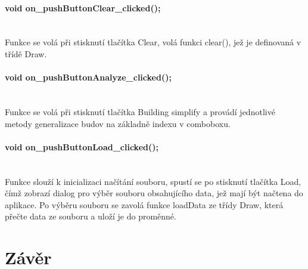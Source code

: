 \documentclass[11pt]{article}
\begin{document}
	 	\paragraph{ void on\_pushButtonClear\_clicked();}\mbox{}\\
	 	Funkce se volá při stisknutí tlačítka Clear, volá funkci clear(), jež je definovaná v třídě Draw.
	 	
	 	\paragraph{ void on\_pushButtonAnalyze\_clicked();}\mbox{}\\
	 	Funkce se volá při stisknutí tlačítka Building simplify a provádí jednotlivé metody generalizace budov na základně indexu v comboboxu. 
	 	
	 	\paragraph{void on\_pushButtonLoad\_clicked();}\mbox{}\\
	 	Funkce slouží k inicializaci načítání souboru, spustí se po stisknutí tlačítka Load, čímž zobrazí dialog pro výběr souboru obsahujícího data, jež mají být načtena do aplikace. Po výběru souboru se zavolá funkce loadData ze třídy Draw, která přečte data ze souboru a uloží je do proměnné.
	 	
		
		
		\section{Závěr}
		
		
		

		
	
\end{document}
